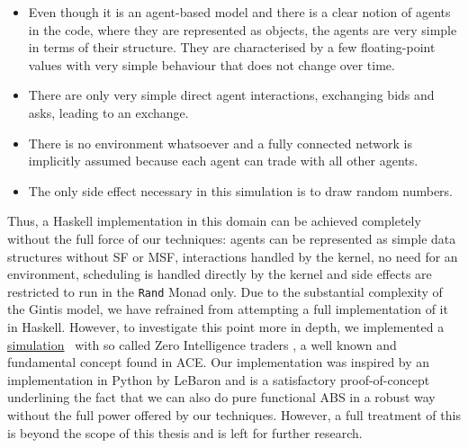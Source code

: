 \begin{itemize}
	\item Even though it is an agent-based model and there is a clear notion of agents in the code, where they are represented as objects, the agents are very simple in terms of their structure. They are characterised by a few floating-point values with very simple behaviour that does not change over time.

	\item There are only very simple direct agent interactions, exchanging bids and asks, leading to an exchange.

	\item There is no environment whatsoever and a fully connected network is implicitly assumed because each agent can trade with all other agents.
	
	\item The only side effect necessary in this simulation is to draw random numbers.
\end{itemize}

Thus, a Haskell implementation in this domain can be achieved completely without the full force of our techniques: agents can be represented as simple data structures without SF or MSF, interactions handled by the kernel, no need for an environment, scheduling is handled directly by the kernel and side effects are restricted to run in the \texttt{Rand} Monad only. Due to the substantial complexity of the Gintis model, we have refrained from attempting a full implementation of it in Haskell. However, to investigate this point more in depth, we implemented a \href{https://github.com/thalerjonathan/zerointelligence}{simulation}~\cite{thaler_zerointelligence_repository} with so called Zero Intelligence traders \cite{gode_allocative_1993}, a well known and fundamental concept found in ACE. Our implementation was inspired by an implementation in Python by LeBaron \cite{lebaron_zerointelligence} and is a satisfactory proof-of-concept underlining the fact that we can also do pure functional ABS in a robust way without the full power offered by our techniques. However, a full treatment of this is beyond the scope of this thesis and is left for further research.

